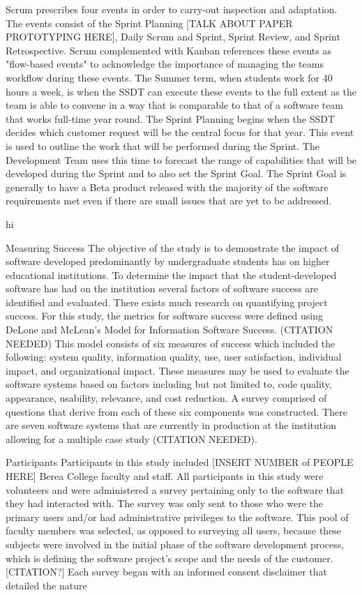 Scrum prescribes four events in order to carry-out inspection and adaptation. The events consist of the Sprint Planning [TALK ABOUT PAPER PROTOTYPING HERE], Daily Scrum and Sprint, Sprint Review, and Sprint Retrospective. Scrum complemented with Kanban references these events as "flow-based events" to acknowledge the importance of managing the teams workflow during these events. The Summer term, when students work for 40 hours a week, is when the SSDT can execute these events to the full extent as the team is able to convene in a way that is comparable to that of a software team that works full-time year round. The Sprint Planning begins when the SSDT decides which customer request will be the central focus for that year. This event is used to outline the work that will be performed during the Sprint. The Development Team uses this time to forecast the range of capabilities that will be developed during the Sprint and to also set the Sprint Goal. The Sprint Goal is generally to have a Beta product released with the majority of the software requirements met even if there are small issues that are yet to be addressed.

hi

 Measuring Success
The objective of the study is to demonstrate the impact of software developed predominantly by undergraduate students has on higher educational institutions. To determine the impact that the student-developed software has had on the institution several factors of software success are identified and evaluated.  There exists much research on quantifying project success. For this study, the metrics for software success were defined using DeLone and McLean’s Model for Information Software Success. (CITATION NEEDED) This model consists of six measures of success which included the following: system quality, information quality, use, user satisfaction, individual impact, and organizational impact. These measures may be used to evaluate the software systems based on factors including but not limited to, code quality, appearance, usability, relevance, and cost reduction.  A survey comprised of questions that derive from each of these six components was constructed. There are seven software systems that are currently in production at the institution allowing for a multiple case study (CITATION NEEDED).

    Participants
Participants in this study included [INSERT NUMBER of PEOPLE HERE] Berea College faculty and staff. All participants in this study were volunteers and were administered a survey pertaining only to the software that they had interacted with. The survey was only sent to those who were the primary users and/or had administrative privileges to the software. This pool of faculty members was selected, as opposed to surveying all users, because these subjects were involved in the initial phase of the software development process, which is defining the software project’s scope and the needs of the customer. [CITATION?] Each survey began with an informed consent disclaimer that detailed the nature

